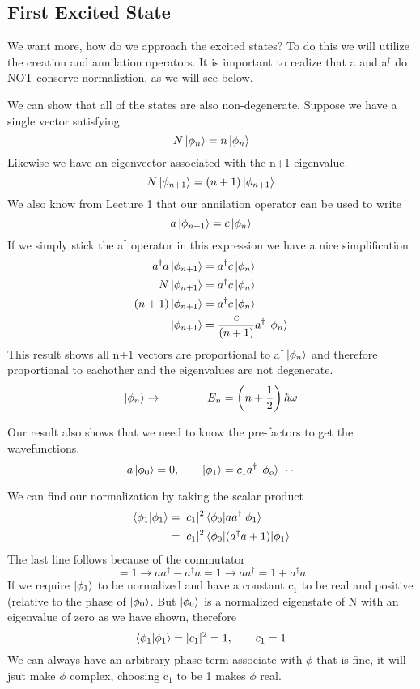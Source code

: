 \documentclass{article}
\newcommand{\be}{\begin{equation}}
\newcommand{\ee}{\end{equation}}
\newcommand{\dg}{\dagger}
\begin{document}
\subsection*{First Excited State}
We want more, how do we approach the excited states?
To do this we will utilize the creation and annilation operators.
It is important to realize that a and a$^\dg$ do NOT conserve normaliztion, as we will see below.

We can show that all of the states are also non-degenerate.
Suppose we have a single vector satisfying 
\be
N\ket{\phi_n} = n\ket{\phi_n}
\ee
Likewise we have an eigenvector associated with the n+1 eigenvalue.
\be
N\ket{\phi_{n+1}} = (n+1)\ket{\phi_{n+1}}
\ee
We also know from Lecture 1 that our annilation operator can be used to write
\be
a\ket{\phi_{n+1}} = c\ket{\phi_n}
\ee
If we simply stick the a$^\dg$ operator in this expression we have a nice simplification
\be
\begin{split}
    a^\dg a\ket{\phi_{n+1}} &= a^\dg c\ket{\phi_n}\\
    N\ket{\phi_{n+1}} &= a^\dg c\ket{\phi_n}\\
    (n+1)\ket{\phi_{n+1}} &= a^\dg c\ket{\phi_n}\\
    \ket{\phi_{n+1}} &= \frac{c}{(n+1)}a^\dg\ket{\phi_n}\\
\end{split}
\ee
This result shows all n+1 vectors are proportional to a$^\dg \ket{\phi_n}$ and therefore proportional to eachother and the eigenvalues are not degenerate. 
\be
\ket{\phi_n} \rightarrow \qquad \qquad E_n = \left(n + \frac{1}{2}\right)\hbar\omega
\ee

Our result also shows that we need to know the pre-factors to get the wavefunctions.
\be
a\ket{\phi_0} = 0, \qquad \ket{\phi_1} = c_1a^\dg\ket{\phi_o} \cdots
\ee

We can find our normalization by taking the scalar product
\be
\begin{split}
    \braket{\phi_1|\phi_1} &= |c_1|^2 \braket{\phi_0|aa^\dg|\phi_1}\\
    &= |c_1|^2 \braket{\phi_0|(a^\dg a+1)|\phi_1}
\end{split}
\ee
The last line follows because of the commutator
\be
[a,a^\dg] = 1 \rightarrow aa^\dg - a^\dg a = 1 \rightarrow  aa^\dg = 1 + a^\dg a
\ee
If we require $\ket{\phi_1}$ to be normalized and have a constant c$_1$ to be real and positive (relative to the phase of $\ket{\phi_0}$.
But $\ket{\phi_0}$ is a normalized eigenstate of N with an eigenvalue of zero as we have shown, therefore
\be
\braket{\phi_1|\phi_1} = |c_1|^2 = 1, \qquad c_1 = 1
\ee
We can always have an arbitrary phase term associate with $\phi$ that is fine, it will jsut make $\phi$ complex, choosing c$_1$ to be 1 makes $\phi$ real. 
\end{document}
